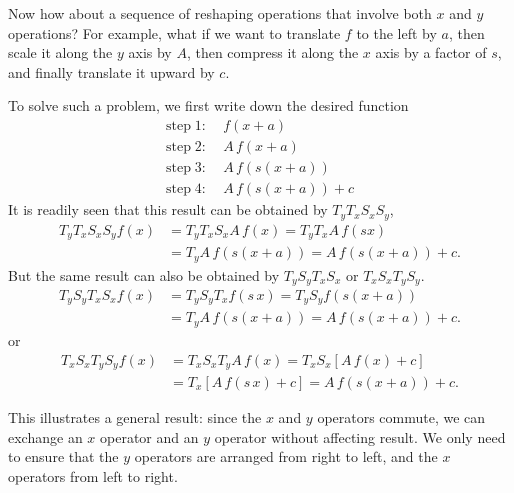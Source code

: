 \documentclass{article}
\begin{document}
Now how about a sequence of reshaping operations that involve both $x$ and $y$ operations?
%
For example,
what if we want to translate $f$ to the left by $a$,
then scale it along the $y$ axis by $A$,
then compress it along the $x$ axis by a factor of $s$,
and finally translate it upward by $c$.

To solve such a problem, we first write down the desired function
$$
\begin{aligned}
\mathrm{step}\; 1:\;& f(x+a) \\
\mathrm{step}\; 2:\;& A \, f(x+a) \\
\mathrm{step}\; 3:\;& A \, f(s(x+a)) \\
\mathrm{step}\; 4:\;& A \, f(s(x+a)) + c
\end{aligned}
$$
It is readily seen that this result can be obtained by $T_y T_x S_x S_y$,
$$
\begin{aligned}
T_y T_x S_x S_y f(x)
&= T_y T_x S_x A \, f(x) = T_y T_x A \, f(s x) \\
&= T_y A \, f(s(x+a)) = A \, f(s(x+a)) + c.
\end{aligned}
$$
But the same result can also be obtained by
$T_y S_y T_x S_x$ or $T_x S_x T_y S_y$.
$$
\begin{aligned}
T_y S_y T_x S_x f(x)
&= T_y S_y T_x f(s \, x) = T_y S_y f(s (x + a) ) \\
&= T_y A \, f(s(x+a)) = A \, f(s(x+a)) + c.
\end{aligned}
$$
or
$$
\begin{aligned}
T_x S_x T_y S_y f(x)
&= T_x S_x T_y A \, f(x) = T_x S_x [A \, f(x) + c] \\
&= T_x [A \, f(s \, x) + c] = A \, f(s(x+a)) + c.
\end{aligned}
$$

This illustrates a general result:
since the $x$ and $y$ operators commute,
we can exchange an $x$ operator
and an $y$ operator without affecting result.
%
We only need to ensure that the $y$ operators are arranged from right to left,
and the $x$ operators from left to right.
\end{document}
